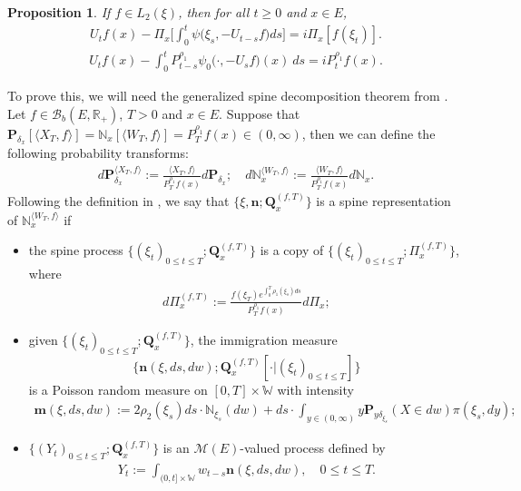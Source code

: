 \documentclass[12pt,a4paper]{amsart}
\theoremstyle{plain}
\newtheorem{prop}[thm]{Proposition}
\theoremstyle{definition}
\numberwithin{equation}{section}
\begin{document}
\begin{prop}
  \label{prop: complex FKPP-equation}
  If $f\in L_2(\xi)$,  then for all $t\geq 0$ and $x\in E$,
\begin{align}
  \label{eq: complex FKPP-equation}
  U_tf(x) - \Pi_x \Big[\int_0^t \psi\big(\xi_s, - U_{t-s}f\big) ds \Big]
  = i \Pi_x [f(\xi_t)].
\end{align}
\begin{align}
  \label{eq: complex FKPP-equation with FK-transform}
  U_tf(x) -  \int_0^t P_{t-s}^{\rho_1} \psi_0\big(\cdot,-U_sf\big) (x)~ds
  = iP_t^{\rho_1} f(x).
\end{align}
\end{prop}

To prove this, we will need the generalized spine decomposition theorem from \cite{RenSongSun2017Spine}.
Let $f\in \mathcal B_b(E,\mathbb R_+)$, $T >0$ and $x\in E$.
Suppose that $\mathbf P_{\delta_x}[\langle X_T, f\rangle] = \mathbb N_x[\langle W_T, f\rangle] = P^{\rho_1}_T f(x) \in (0,\infty)$, then we can define the following probability transforms:
\begin{align}
  d\mathbf P_{\delta_x}^{\langle X_T, f\rangle}
  := \frac{\langle X_T, f\rangle}{P_T^{\rho_1} f(x)} d\mathbf P_{\delta_x};
  \quad d\mathbb N_x^{\langle W_T, f\rangle}
  :=  \frac{\langle W_T, f\rangle}{P_T^{\rho_1} f(x)} d\mathbb N_x.
\end{align}
Following the definition in \cite{RenSongSun2017Spine}, we say that $\{\xi, \mathbf n;\mathbf Q_{x}^{(f,T)}\}$ is a spine representation of $\mathbb N_x^{\langle W_T, f\rangle}$ if
\begin{itemize}
\item
  the spine process $\{(\xi_t)_{0\leq t\leq T}; \mathbf Q^{(f,T)}_x\}$ is a copy of $\{(\xi_t)_{0\leq t\leq T}; \Pi^{(f,T)}_{x}\}$, where
  \begin{align}
    d\Pi_x^{(f,T)}
    := \frac{f(\xi_T)e^{\int_0^T \rho_1(\xi_s)ds}}{P^{\rho_1}_T f(x)} d \Pi_x;
  \end{align}
\item
  given $\{(\xi_t)_{0\leq t\leq T}; \mathbf Q^{(f,T)}_x\}$, the immigration measure
\[
  \{\mathbf n(\xi,ds,dw); \mathbf Q^{(f,T)}_x[\cdot |(\xi_t)_{0\leq t\leq T}]\}
\]
is a Poisson random measure on $[0,T] \times \mathbb W$ with intensity
\begin{align}
  \label{eq: conditional intensity}
  \mathbf m(\xi,ds,dw)
  := 2 \rho_2(\xi_s) ds \cdot \mathbb N_{\xi_s}(dw) + ds \cdot \int_{y\in (0,\infty)} y \mathbf P_{y\delta_{\xi_s}}(X\in dw) \pi(\xi_s,dy);
\end{align}
\item
  $\{(Y_t)_{0\leq t\leq T}; \mathbf Q^{(f,T)}_x\}$ is an $\mathcal M(E)$-valued process defined by
  \begin{align}
    Y_t
    := \int_{(0,t] \times \mathbb W} w_{t-s} \mathbf n(\xi,ds,dw),
    \quad 0 \leq t\leq T.
  \end{align}
\end{itemize}
\end{document}
